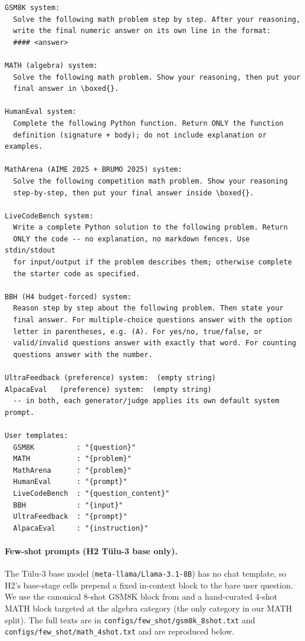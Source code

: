\begin{lstlisting}[basicstyle=\ttfamily\footnotesize,breaklines=true,frame=single]
GSM8K system:
  Solve the following math problem step by step. After your reasoning,
  write the final numeric answer on its own line in the format:
  #### <answer>

MATH (algebra) system:
  Solve the following math problem. Show your reasoning, then put your
  final answer in \boxed{}.

HumanEval system:
  Complete the following Python function. Return ONLY the function
  definition (signature + body); do not include explanation or examples.

MathArena (AIME 2025 + BRUMO 2025) system:
  Solve the following competition math problem. Show your reasoning
  step-by-step, then put your final answer inside \boxed{}.

LiveCodeBench system:
  Write a complete Python solution to the following problem. Return
  ONLY the code -- no explanation, no markdown fences. Use stdin/stdout
  for input/output if the problem describes them; otherwise complete
  the starter code as specified.

BBH (H4 budget-forced) system:
  Reason step by step about the following problem. Then state your
  final answer. For multiple-choice questions answer with the option
  letter in parentheses, e.g. (A). For yes/no, true/false, or
  valid/invalid questions answer with exactly that word. For counting
  questions answer with the number.

UltraFeedback (preference) system:  (empty string)
AlpacaEval   (preference) system:  (empty string)
  -- in both, each generator/judge applies its own default system prompt.

User templates:
  GSM8K          : "{question}"
  MATH           : "{problem}"
  MathArena      : "{problem}"
  HumanEval      : "{prompt}"
  LiveCodeBench  : "{question_content}"
  BBH            : "{input}"
  UltraFeedback  : "{prompt}"
  AlpacaEval     : "{instruction}"
\end{lstlisting}

\paragraph{Few-shot prompts (H2 Tülu-3 base only).}
The Tülu-3 base model (\texttt{meta-llama/Llama-3.1-8B}) has no chat
template, so H2's base-stage cells prepend a fixed in-context block to
the bare user question. We use the canonical 8-shot GSM8K block from
\citet{wei2022chain} and a hand-curated 4-shot MATH block targeted at
the algebra category (the only category in our MATH split). The full
texts are in \texttt{configs/few\_shot/gsm8k\_8shot.txt} and
\texttt{configs/few\_shot/math\_4shot.txt} and are reproduced below.

